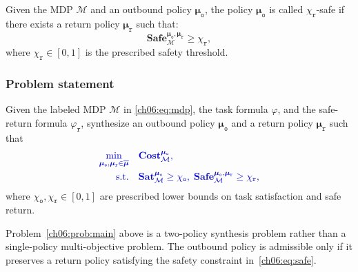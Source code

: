 \begin{definition}
\label{ch06:def:safety}
Given the MDP $\mathcal{M}$ and an outbound policy
$\boldsymbol{\mu}_{\texttt{o}}$, the policy
$\boldsymbol{\mu}_{\texttt{o}}$ is called $\chi_{\texttt{r}}$-safe if there
exists a return policy $\boldsymbol{\mu}_{\texttt{r}}$ such that:
\begin{equation}
\label{ch06:eq:safe}
\textbf{Safe}_{\mathcal{M}}^{
\boldsymbol{\mu}_{\texttt{o}},\boldsymbol{\mu}_{\texttt{r}}
}
\geq \chi_{\texttt{r}},
\end{equation}
where $\chi_{\texttt{r}} \in [0,1]$ is the prescribed safety threshold.
\end{definition}

\subsubsection{Problem statement}
\label{ch06:subsec:problem}

\begin{problem}
\label{ch06:prob:main}
Given the labeled MDP $\mathcal{M}$ in \eqref{ch06:eq:mdp}, the task formula
$\varphi$, and the safe-return formula $\varphi_{\texttt{r}}$, synthesize an
outbound policy $\boldsymbol{\mu}_{\texttt{o}}$ and a return policy
$\boldsymbol{\mu}_{\texttt{r}}$ such that
\begin{equation}
\color{blue}
\label{ch06:eq:objective}
\begin{aligned}
\min_{
\boldsymbol{\mu}_{\texttt{o}},\boldsymbol{\mu}_{\texttt{r}}
\in \overline{\boldsymbol{\mu}}
}
\quad
&\textbf{Cost}_{\mathcal{M}}^{\boldsymbol{\mu}_{\texttt{o}}}, \\
\text{s.t.}\quad
&\textbf{Sat}_{\mathcal{M}}^{\boldsymbol{\mu}_{\texttt{o}}}
\geq \chi_{\texttt{o}}, \; \textbf{Safe}_{\mathcal{M}}^{
\boldsymbol{\mu}_{\texttt{o}},\boldsymbol{\mu}_{\texttt{r}}
}
\geq \chi_{\texttt{r}},
\end{aligned}
\end{equation}
where $\chi_{\texttt{o}}, \chi_{\texttt{r}} \in [0,1]$ are prescribed lower
bounds on task satisfaction and safe return.
\end{problem}

Problem~\ref{ch06:prob:main} above is a two-policy synthesis problem rather than a
single-policy multi-objective problem. The outbound policy is admissible only
if it preserves a return policy satisfying the safety constraint in~\eqref{ch06:eq:safe}.



